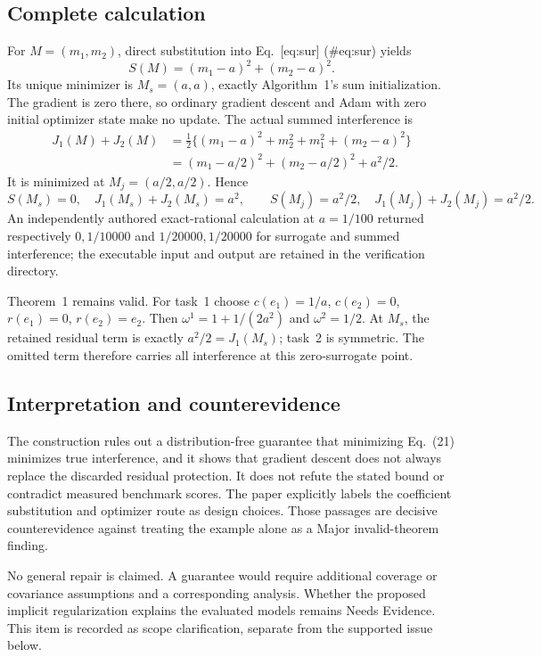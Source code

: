 \documentclass[10pt]{article}
\begin{document}
\subsection*{Complete calculation}
For \(M=(m_1,m_2)\), direct substitution into Eq. [eq:sur] (\#eq:sur) yields \[S(M)=(m_1-a)^2+(m_2-a)^2.\] Its unique minimizer is \(M_s=(a,a)\), exactly Algorithm 1’s sum initialization. The gradient is zero there, so ordinary gradient descent and Adam with zero initial optimizer state make no update. The actual summed interference is \[\begin{aligned}
 J_1(M)+J_2(M)
 &=\tfrac12\{(m_1-a)^2+m_2^2+m_1^2+(m_2-a)^2\}\\
 &=(m_1-a/2)^2+(m_2-a/2)^2+a^2/2.\end{aligned}\] It is minimized at \(M_j=(a/2,a/2)\). Hence \[S(M_s)=0,\quad J_1(M_s)+J_2(M_s)=a^2,
 \qquad S(M_j)=a^2/2,\quad J_1(M_j)+J_2(M_j)=a^2/2.\] An independently authored exact-rational calculation at \(a=1/100\) returned respectively \(0,1/10000\) and \(1/20000,1/20000\) for surrogate and summed interference; the executable input and output are retained in the verification directory.\par
Theorem 1 remains valid. For task 1 choose \(c(e_1)=1/a\), \(c(e_2)=0\), \(r(e_1)=0\), \(r(e_2)=e_2\). Then \(\omega^1=1+1/(2a^2)\) and \(\omega^2=1/2\). At \(M_s\), the retained residual term is exactly \(a^2/2=J_1(M_s)\); task 2 is symmetric. The omitted term therefore carries all interference at this zero-surrogate point.\par
\subsection*{Interpretation and counterevidence}
The construction rules out a distribution-free guarantee that minimizing Eq. (21) minimizes true interference, and it shows that gradient descent does not always replace the discarded residual protection. It does not refute the stated bound or contradict measured benchmark scores. The paper explicitly labels the coefficient substitution and optimizer route as design choices. Those passages are decisive counterevidence against treating the example alone as a Major invalid-theorem finding.\par
No general repair is claimed. A guarantee would require additional coverage or covariance assumptions and a corresponding analysis. Whether the proposed implicit regularization explains the evaluated models remains Needs Evidence. This item is recorded as scope clarification, separate from the supported issue below.\par
\end{document}
